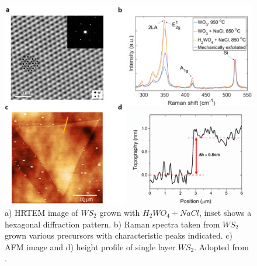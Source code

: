 \begin{figure}[h]
	\begin{center}
		\includegraphics[scale=0.3]{PaperAFM.png}
		\caption{a) HRTEM image of $WS_2$ grown with $H_2WO_4+NaCl$, inset shows a hexagonal diffraction pattern. b) Raman spectra taken from $WS_2$ grown various precursors with characteristic peaks indicated. c) AFM image and d) height profile of single layer $WS_2$. Adopted from \cite{Reale2017}.}
		\label{fig:PaperAFM}
	\end{center}
\end{figure}

